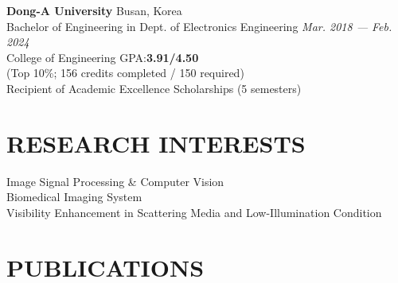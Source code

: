 \documentclass[a4paper,9pt]{extarticle}
\begin{document}
\noindent
\textbf{Dong-A University} \hfill Busan, Korea \\
Bachelor of Engineering in Dept. of Electronics Engineering \hfill \textit{Mar. 2018 — Feb. 2024} \\
College of Engineering \hfill GPA:\textbf{3.91/4.50} \\
(Top 10\%; 156 credits completed / 150 required) \\
Recipient of Academic Excellence Scholarships (5 semesters) \\

\section*{RESEARCH INTERESTS}
Image Signal Processing \& Computer Vision \\
Biomedical Imaging System \\
Visibility Enhancement in Scattering Media and Low-Illumination Condition \\


\section*{PUBLICATIONS}
\end{document}
